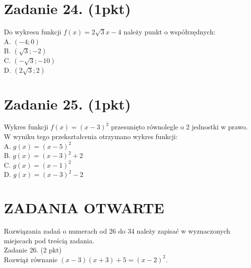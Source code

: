 \documentclass[10pt]{article}
\begin{document}
\section*{Zadanie 24. (1pkt)}
Do wykresu funkcji \(f(x)=2 \sqrt{3} x-4\) należy punkt o współrzędnych:\\
A. \((-4 ; 0)\)\\
B. \((\sqrt{3} ;-2)\)\\
C. \((-\sqrt{3} ;-10)\)\\
D. \((2 \sqrt{3} ; 2)\)

\section*{Zadanie 25. (1pkt)}
Wykres funkcji \(f(x)=(x-3)^{2}\) przesunięto równolegle o 2 jednostki w prawo. W wyniku tego przekształcenia otrzymano wykres funkcji:\\
A. \(g(x)=(x-5)^{2}\)\\
B. \(g(x)=(x-3)^{2}+2\)\\
C. \(g(x)=(x-1)^{2}\)\\
D. \(g(x)=(x-3)^{2}-2\)

\section*{ZADANIA OTWARTE}
Rozwiązania zadań o numerach od 26 do 34 należy zapisać w wyznaczonych miejscach pod treścią zadania.\\
Zadanie 26. (2 pkt)\\
Rozwiąż równanie \((x-3)(x+3)+5=(x-2)^{2}\).
\end{document}
